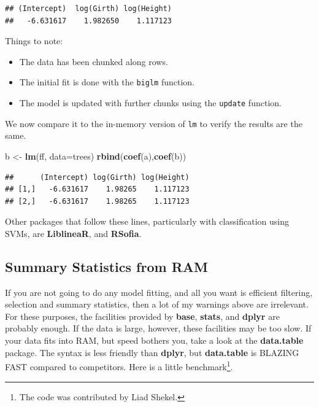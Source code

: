 \documentclass[]{book}
\newenvironment{Shaded}{\begin{snugshade}}{\end{snugshade}}
\newcommand{\KeywordTok}[1]{\textcolor[rgb]{0.13,0.29,0.53}{\textbf{#1}}}
\newcommand{\DataTypeTok}[1]{\textcolor[rgb]{0.13,0.29,0.53}{#1}}
\newcommand{\StringTok}[1]{\textcolor[rgb]{0.31,0.60,0.02}{#1}}
\newcommand{\NormalTok}[1]{#1}
\providecommand{\tightlist}{%
  \setlength{\itemsep}{0pt}\setlength{\parskip}{0pt}}
\theoremstyle{definition}
\theoremstyle{definition}
\theoremstyle{definition}
\theoremstyle{remark}
\begin{document}
\begin{verbatim}
## (Intercept)  log(Girth) log(Height) 
##   -6.631617    1.982650    1.117123
\end{verbatim}

Things to note:

\begin{itemize}
\tightlist
\item
  The data has been chunked along rows.
\item
  The initial fit is done with the \texttt{biglm} function.
\item
  The model is updated with further chunks using the \texttt{update}
  function.
\end{itemize}

We now compare it to the in-memory version of \texttt{lm} to verify the
results are the same.

\begin{Shaded}
\begin{Highlighting}[]
\NormalTok{b <-}\StringTok{ }\KeywordTok{lm}\NormalTok{(ff, }\DataTypeTok{data=}\NormalTok{trees)}
\KeywordTok{rbind}\NormalTok{(}\KeywordTok{coef}\NormalTok{(a),}\KeywordTok{coef}\NormalTok{(b))}
\end{Highlighting}
\end{Shaded}

\begin{verbatim}
##      (Intercept) log(Girth) log(Height)
## [1,]   -6.631617    1.98265    1.117123
## [2,]   -6.631617    1.98265    1.117123
\end{verbatim}

Other packages that follow these lines, particularly with classification
using SVMs, are \textbf{LiblineaR}, and \textbf{RSofia}.

\subsection{Summary Statistics from
RAM}\label{summary-statistics-from-ram}

If you are not going to do any model fitting, and all you want is
efficient filtering, selection and summary statistics, then a lot of my
warnings above are irrelevant. For these purposes, the facilities
provided by \textbf{base}, \textbf{stats}, and \textbf{dplyr} are
probably enough. If the data is large, however, these facilities may be
too slow. If your data fits into RAM, but speed bothers you, take a look
at the \textbf{data.table} package. The syntax is less friendly than
\textbf{dplyr}, but \textbf{data.table} is BLAZING FAST compared to
competitors. Here is a little benchmark\footnote{The code was
  contributed by Liad Shekel.}.
\end{document}
